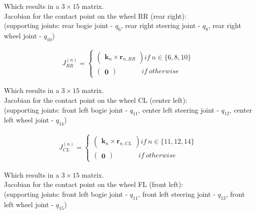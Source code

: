 \documentclass[a4paper]{article}
\begin{document}
\noindent Which results in a $3 \times 15$ matrix. \\

\noindent Jacobian for the contact point on the wheel RR (rear right): \\
\noindent (supporting joints: rear bogie joint - $q_{6}$, rear right steering joint - $q_{8}$, rear right wheel joint - $q_{10}$)

\begin{align}
J^{(n)}_{RR} =
\begin{cases}
        \begin{pmatrix} \boldsymbol{k}_{n} \times \boldsymbol{r}_{n, RR} \end{pmatrix} if \ n \in \{6, 8, 10\}\\
        \begin{pmatrix} \boldsymbol{0} \end{pmatrix} \ \ \ \ \ \ \ \ \ \ \ \ \ \ \ \ if \  otherwise
\end{cases}
\end{align}

\noindent Which results in a $3 \times 15$ matrix. \\ 

\noindent Jacobian for the contact point on the wheel CL (center left): \\
\noindent (supporting joints: front left bogie joint - $q_{11}$, center left steering joint - $q_{12}$, center left wheel joint - $q_{14}$)

\begin{align}
J^{(n)}_{CL} =
\begin{cases}
        \begin{pmatrix} \boldsymbol{k}_{n} \times \boldsymbol{r}_{n, CL} \end{pmatrix} if \ n \in \{11, 12, 14\}\\
        \begin{pmatrix} \boldsymbol{0} \end{pmatrix} \ \ \ \ \ \ \ \ \ \ \ \ \ \ \ \ if \  otherwise
\end{cases}
\end{align}

\noindent Which results in a $3 \times 15$ matrix. \\

\noindent Jacobian for the contact point on the wheel FL (front left): \\
\noindent (supporting joints: front left bogie joint - $q_{11}$, front left steering joint - $q_{13}$, front left wheel joint - $q_{15}$)
\end{document}
